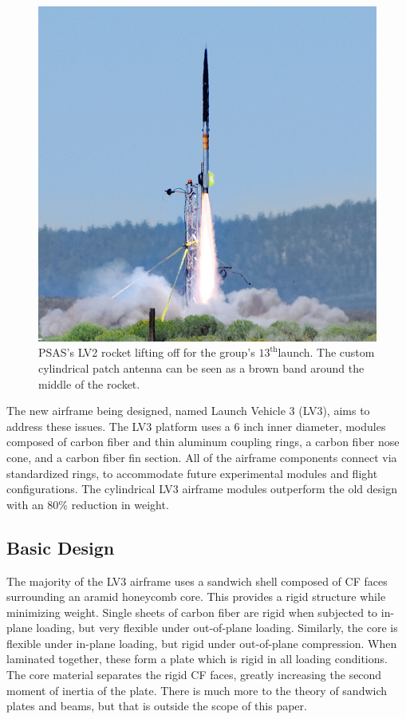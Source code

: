 \documentclass{aiaa-tc}%
\newcommand{\weightReduction}{80\%}
\begin{document}
\begin{figure}
\centering
\includegraphics[width=\linewidth]{../img/L12-cropped.png}
\caption{PSAS's LV2 rocket lifting off for the group's $13^\text{th}$launch. The custom cylindrical patch antenna can be seen as a brown band around the middle of the rocket.}
\label{fig:L-12}
\end{figure}

The new airframe being designed, named Launch Vehicle 3 (LV3), aims to address these issues. The LV3 platform uses a 6 inch inner diameter, modules composed of carbon fiber and thin aluminum coupling rings, a carbon fiber nose cone, and a carbon fiber fin section. All of the airframe components connect via standardized rings, to accommodate future experimental modules and flight configurations.
The cylindrical LV3 airframe modules outperform the old design with an \weightReduction{} reduction in weight.

\subsection{Basic Design}
The majority of the LV3 airframe uses a sandwich shell composed of CF faces surrounding an aramid honeycomb core. This provides a rigid structure while minimizing weight. 
Single sheets of carbon fiber are rigid when subjected to in-plane loading, but very flexible under out-of-plane loading. Similarly, the core is flexible under in-plane loading, but rigid under out-of-plane compression. 
When laminated together, these form a plate which is rigid in all loading conditions. The core material separates the rigid CF faces, greatly increasing the second moment of inertia of the plate. There is much more to the theory of sandwich plates and beams, but that is outside the scope of this paper. 
\end{document}
